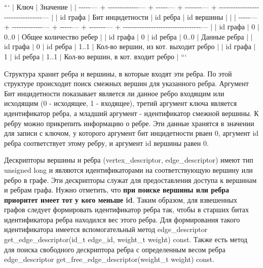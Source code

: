 \begin{DoxyEnumerate}
``` $\vert$ Ключ $\vert$ Значение $\vert$ $\vert$ -\/-\/-\/-\/-\/--- + -\/-\/-\/-\/-\/-\/-\/-\/-\/-\/-\/-\/-\/--- + -\/-\/-\/-\/-\/--- + -\/-\/-\/-\/-\/-\/-\/--- + -\/-\/-\/-\/-\/-\/-\/-\/-\/-\/-\/-\/-\/-\/-\/-\/-\/-\/-\/-\/-\/-\/-\/-\/-\/-\/-\/-\/-\/-\/-\/-\/-\/--- $\vert$ $\vert$ id графа $\vert$ Бит инцидетности $\vert$ id ребра $\vert$ id вершины $\vert$ $\vert$ $\vert$ -\/-\/-\/-\/-\/--- + -\/-\/-\/-\/-\/-\/-\/-\/-\/-\/-\/-\/-\/--- + -\/-\/-\/-\/-\/--- + -\/-\/-\/-\/-\/-\/-\/--- + -\/-\/-\/-\/-\/-\/-\/-\/-\/-\/-\/-\/-\/-\/-\/-\/-\/-\/-\/-\/-\/-\/-\/-\/-\/-\/-\/-\/-\/-\/-\/-\/-\/--- $\vert$ $\vert$ id графа $\vert$ 0 $\vert$ 0..0 $\vert$ Общее количество ребер $\vert$ $\vert$ id графа $\vert$ 0 $\vert$ id ребра $\vert$ 0..0 $\vert$ Данные ребра $\vert$ $\vert$ id графа $\vert$ 0 $\vert$ id ребра $\vert$ 1..1 $\vert$ Кол-\/во вершин, из кот. выходит ребро $\vert$ $\vert$ id графа $\vert$ 1 $\vert$ id ребра $\vert$ 1..1 $\vert$ Кол-\/во вершин, в кот. входит ребро $\vert$ ```

Структура хранит ребра и вершины, в которые входят эти ребра. По этой структуре происходит поиск смежных вершин для указанного ребра. Аргумент {\ttfamily Бит инцидетности} показывает является ли данное ребро входящим или исходящим (0 -\/ исходящее, 1 -\/ входящее), третий аргумент ключа является идентификатор ребра, а младший аргумент -\/ идентификатор смежной вершины. К ребру можно прикрепить информацию о ребре. Эти данные хранятся в значении для записи с ключом, у которого аргумент бит инцидетности рваен 0, аргумент {\ttfamily id ребра} соответствует этому ребру, и аргумент {\ttfamily id вершины} равен 0.
\end{DoxyEnumerate}

Дескрипторы вершины и ребра ({\ttfamily vertex\+\_\+descriptor}, {\ttfamily edge\+\_\+descriptor}) имеют тип {\ttfamily unsigned long} и являются идентификаторами на соответствующую вершину или ребро в графе. Эти дескрипторы служат для предоставления доступа к вершинам и ребрам графа. Нужно отметить, что {\bfseries при поиске вершины или ребра приоритет имеет тот у кого меньше id}. Таким образом, для взвешенных графов следует формировать идентификатор ребра так, чтобы в старших битах идентификатора ребра находился вес этого ребра. Для формирования такого идентификатора имеется вспомогательный метод {\ttfamily edge\+\_\+descriptor get\+\_\+edge\+\_\+descriptor(id\+\_\+t edge\+\_\+id, weight\+\_\+t weight) const}. Также есть метод для поиска свободного дескриптора ребра с определенным весом ребра {\ttfamily edge\+\_\+descriptor get\+\_\+free\+\_\+edge\+\_\+descriptor(weight\+\_\+t weight) const}.


